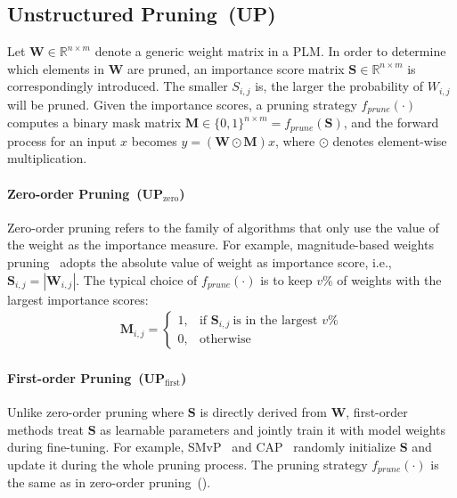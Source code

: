 \subsection{Unstructured  Pruning~(UP)}
\label{sec:pruning}
Let $\bm{W}\in \mathbb{R}^{n\times m}$ denote a generic weight matrix in a PLM. In order to determine which elements in $\bm{W}$ are pruned, an importance score matrix $\bm{S}\in \mathbb{R}^{n\times m}$ is correspondingly introduced. The smaller $S_{i,j}$ is, the larger the probability of $W_{i,j}$ will be pruned. Given the importance scores, a pruning strategy $f_{prune}(\cdot)$ computes a binary mask matrix $\bm{M}\in \{0,1\}^{n\times m}=f_{prune}(\bm{S})$, 
and the forward process for an input $x$ becomes $y=(\bm{W}\odot\bm{M})x$, 
where $\odot$ denotes element-wise multiplication.

\paragraph{Zero-order Pruning~(UP$_{\text{zero}}$)} Zero-order pruning refers to the family of algorithms that only use the value of the weight as the importance measure.
For example, magnitude-based weights pruning~\cite{mag,chen2020lottery} adopts the absolute value of weight as importance score, i.e., 
$\bm{S}_{i, j}=|\bm{W}_{i, j}|$. The typical choice of $f_{prune}(\cdot)$ is to keep $v\%$  of weights with the largest importance scores:
\begin{align}
	\bm{M}_{i,j}=
	\begin{cases} 
		1, & \text{if }\bm{S}_{i,j}~\text{is in the largest }v\%\\
		0,  & \text{otherwise}  
	\end{cases}
	\label{eq:zero}
\end{align}


\paragraph{First-order Pruning~(UP$_\text{first}$)} Unlike zero-order pruning where $\bm{S}$ is directly derived from $\bm{W}$, first-order methods treat 
$\bm{S}$ as learnable parameters and jointly train it with model weights 
during fine-tuning. For example, SMvP~\cite{movement} and CAP~\cite{cap}
randomly initialize $\bm{S}$ and update it during the whole pruning process. The pruning strategy $f_{prune}(\cdot)$ is the same as in zero-order pruning~().




